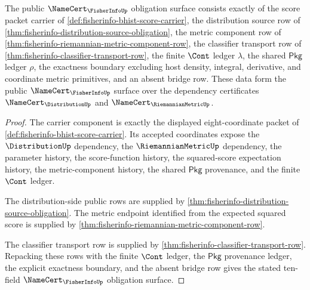 \begin{theorem}
\label{thm:fisherinfo-public-certificate-surface}
The public $\NameCert_{\FisherInfoUp}$ obligation surface consists exactly of
the score packet carrier of
\autoref{def:fisherinfo-bhist-score-carrier}, the distribution source row of
\autoref{thm:fisherinfo-distribution-source-obligation}, the metric component
row of \autoref{thm:fisherinfo-riemannian-metric-component-row}, the
classifier transport row of
\autoref{thm:fisherinfo-classifier-transport-row}, the finite $\Cont$ ledger
$\lambda$, the shared $\mathsf{Pkg}$ ledger $\rho$, the exactness boundary
excluding host density, integral, derivative, and coordinate metric
primitives, and an absent bridge row. These data form the public
$\NameCert_{\FisherInfoUp}$ surface over the dependency certificates
$\NameCert_{\DistributionUp}$ and $\NameCert_{\RiemannianMetricUp}$.
\end{theorem}
\begin{proof}
The carrier component is exactly the displayed eight-coordinate packet of
\autoref{def:fisherinfo-bhist-score-carrier}. Its accepted coordinates expose
the $\DistributionUp$ dependency, the $\RiemannianMetricUp$ dependency, the
parameter history, the score-function history, the squared-score expectation
history, the metric-component history, the shared $\mathsf{Pkg}$ provenance,
and the finite $\Cont$ ledger.

The distribution-side public rows are supplied by
\autoref{thm:fisherinfo-distribution-source-obligation}. The metric endpoint
identified from the expected squared score is supplied by
\autoref{thm:fisherinfo-riemannian-metric-component-row}.

The classifier transport row is supplied by
\autoref{thm:fisherinfo-classifier-transport-row}. Repacking these rows with
the finite $\Cont$ ledger, the $\mathsf{Pkg}$ provenance ledger, the explicit
exactness boundary, and the absent bridge row gives the stated ten-field
$\NameCert_{\FisherInfoUp}$ obligation surface.
\end{proof}

